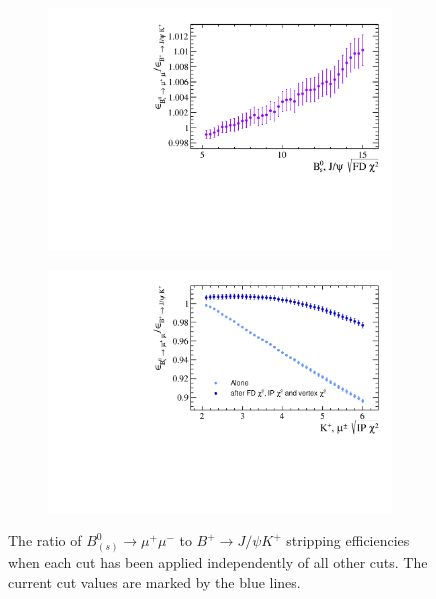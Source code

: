 \begin{figure}[htbp]
    \begin{subfigure}[b]{0.4\textwidth}
        \includegraphics[width=\textwidth]{./Figs/Selection/BsMuMu_JpsiK_FD.pdf}
    \end{subfigure}
   \begin{subfigure}[b]{0.4\textwidth}
        \includegraphics[width=\textwidth]{./Figs/Selection/Bs2MuMu_JpsiK_daughter_IP.pdf}
    \end{subfigure}
    \caption{The ratio of $B^{0}_{(s)}\to\mu^{+} \mu^{-}$ to $B^{+}\to J/\psi K^{+}$ stripping efficiencies when each cut has been applied independently of all other cuts. The current cut values are marked by the blue lines.}
    \label{fig:ratioplotsJpsik}
\end{figure}


